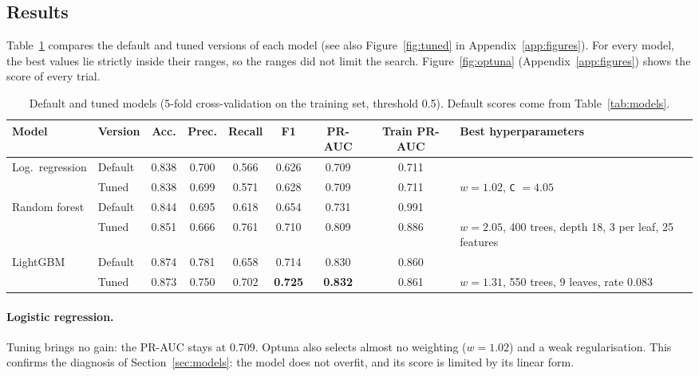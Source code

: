 \documentclass[10pt,a4paper]{article}
\begin{document}
\subsection{Results}

Table~\ref{tab:tuning} compares the default and tuned versions of each model (see also
Figure~\ref{fig:tuned} in Appendix~\ref{app:figures}). For every model, the best values
lie strictly inside their ranges, so the ranges did not limit the search.
Figure~\ref{fig:optuna} (Appendix~\ref{app:figures}) shows the score of every trial.

\begin{table}[htbp]
\centering
\caption{Default and tuned models (5-fold cross-validation on the training set,
threshold 0.5). Default scores come from Table~\ref{tab:models}.}
\label{tab:tuning}
\small
\setlength{\tabcolsep}{4pt}
\begin{tabular}{llcccccc>{\raggedright\arraybackslash}p{3.0cm}}
\toprule
Model & Version & Acc. & Prec. & Recall & F1 & PR-AUC & Train PR-AUC & Best hyperparameters \\
\midrule
Log.\ regression & Default & 0.838 & 0.700 & 0.566 & 0.626 & 0.709 & 0.711 & \\
 & Tuned & 0.838 & 0.699 & 0.571 & 0.628 & 0.709 & 0.711 & $w = 1.02$, \texttt{C} $= 4.05$ \\
\addlinespace
Random forest & Default & 0.844 & 0.695 & 0.618 & 0.654 & 0.731 & 0.991 & \\
 & Tuned & 0.851 & 0.666 & 0.761 & 0.710 & 0.809 & 0.886 & $w = 2.05$, 400 trees, depth 18,
 3 per leaf, 25 features \\
\addlinespace
LightGBM & Default & 0.874 & 0.781 & 0.658 & 0.714 & 0.830 & 0.860 & \\
 & Tuned & 0.873 & 0.750 & 0.702 & \textbf{0.725} & \textbf{0.832} & 0.861 & $w = 1.31$, 550
 trees, 9 leaves, rate 0.083 \\
\bottomrule
\end{tabular}
\end{table}

\paragraph{Logistic regression.}
Tuning brings no gain: the PR-AUC stays at 0.709. Optuna also selects almost no
weighting ($w = 1.02$) and a weak regularisation. This confirms the diagnosis of
Section~\ref{sec:models}: the model does not overfit, and its score is limited by its
linear form.
\end{document}
